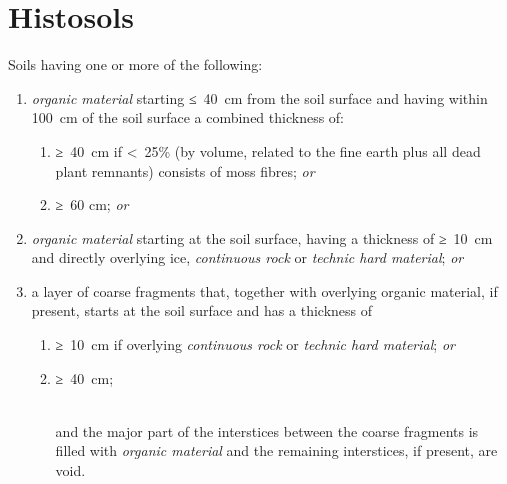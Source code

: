 \documentclass[
  letterpaper,
  DIV=11,
  numbers=noendperiod]{scrreprt}
\providecommand{\tightlist}{%
  \setlength{\itemsep}{0pt}\setlength{\parskip}{0pt}}\usepackage{longtable,booktabs,array}
\begin{document}

\hypertarget{key-histosols}{%
\chapter{Histosols}\label{key-histosols}}

Soils having one or more of the following:

\begin{enumerate}
\def\labelenumi{\arabic{enumi}.}
\tightlist
\item
  \emph{organic material} starting ≤~40~cm from the soil surface and
  having within 100~cm of the soil surface a combined thickness of:

  \begin{enumerate}
  \def\labelenumii{\alph{enumii}.}
  \tightlist
  \item
    ≥~40~cm if \textless~25\% (by volume, related to the fine earth plus
    all dead plant remnants) consists of moss fibres; \emph{or}
  \item
    ≥~60 cm; \emph{or}
  \end{enumerate}
\item
  \emph{organic material} starting at the soil surface, having a
  thickness of ≥~10~cm and directly overlying ice, \emph{continuous
  rock} or \emph{technic hard material}; \emph{or}
\item
  a layer of coarse fragments that, together with overlying organic
  material, if present, starts at the soil surface and has a thickness
  of

  \begin{enumerate}
  \def\labelenumii{\alph{enumii}.}
  \tightlist
  \item
    ≥~10~cm if overlying \emph{continuous rock} or \emph{technic hard
    material}; \emph{or}
  \item
    ≥~40~cm;\\
    \strut \\
    and the major part of the interstices between the coarse fragments
    is filled with \emph{organic material} and the remaining
    interstices, if present, are void.
  \end{enumerate}
\end{enumerate}
\end{document}
